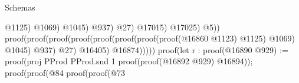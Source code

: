 \begin{lexlean}{Schemas}
\begin{coremodule}
                                                                                                                @1125)
                                                                                                              @1069)
                                                                                                            @1045)
                                                                                                          @937)
                                                                                                        @27)
                                                                                                      @17015)
                                                                                                    @17025)
                                                                                                  @5))
                                                                                            proof(proof(proof(proof(proof(proof(proof(proof(@16860
                                                                                                              @1123)
                                                                                                            @1125)
                                                                                                          @1069)
                                                                                                        @1045)
                                                                                                      @937)
                                                                                                    @27)
                                                                                                  @16405)
                                                                                                @16874)))))
                                                                                  proof(let r : proof(@16890
                                                                                        @929) := proof(proj PProd PProd.snd 1
                                                                                      proof(proof(@16892
                                                                                            @929)
                                                                                          @16894));
                                                                                    proof(proof(@84
                                                                                          proof(proof(@73

\end{coremodule}
\end{lexlean}
